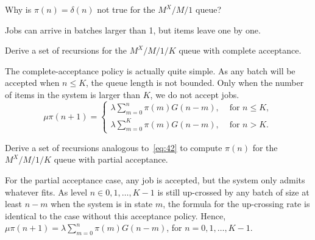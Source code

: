 \begin{exercise}\label{ex:l-154}
 Why is $\pi(n)=\delta(n)$ not true for the $M^X/M/1$  queue?
\begin{solution}
Jobs can arrive in batches larger than 1, but items leave one by one.
\end{solution}
\end{exercise}



\begin{exercise}\label{ex:9}
 Derive a set of recursions for the $M^X/M/1/K$ queue with complete acceptance.
\begin{solution}
 The complete-acceptance policy is actually quite simple. As any
 batch will be accepted when $n\leq K$, the queue length is not
 bounded. Only when the number of items in the system is larger than
 $K$, we do not accept jobs.
 \begin{equation*}
 \mu \pi(n+1) =
 \begin{cases}
 \lambda \sum_{m=0}^n \pi(m) G(n-m), & \text{ for } n\leq K,\\
 \lambda \sum_{m=0}^K \pi(m) G(n-m), & \text{ for } n> K.
 \end{cases}
 \end{equation*}
\end{solution}
\end{exercise}



\begin{exercise}\label{ex:45}
 Derive a set of recursions analogous to~\cref{eq:42} to compute $\pi(n)$ for the $M^X/M/1/K$ queue with partial acceptance.
\begin{solution}
  For the partial acceptance case, any job is accepted, but the system only admits whatever fits.
  As level $n\in {0,1,\ldots,K-1}$ is still up-crossed by any batch of size at least $n-m$ when the system is in state $m$, the formula for the up-crossing rate is identical to the case without this acceptance policy.
  Hence, $\mu \pi(n+1) = \lambda \sum_{m=0}^n \pi(m) G(n-m)$, for $n=0,1,\ldots, K-1$.
\end{solution}
\end{exercise}


